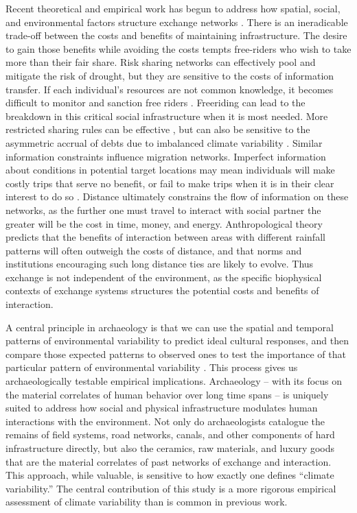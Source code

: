 \documentclass[fleqn,10pt]{wlscirep}
\begin{document}
Recent theoretical and empirical work has begun to address how spatial, social, and environmental factors structure exchange networks \cite{Nolin2010Food-SharingIndonesia,Koster2014,Hao2015,Schnegg2015}. 
There is an ineradicable trade-off between the costs and benefits of maintaining infrastructure. The desire to gain those benefits while avoiding the costs tempts free-riders who wish to take more than their fair share.
Risk sharing networks can effectively pool and mitigate the risk of drought, but they are sensitive to the costs of information transfer. If each individual's resources are not common knowledge, it becomes difficult to monitor and sanction free riders \cite{Hao2015a}. Freeriding can lead to the breakdown in this critical social infrastructure when it is most needed. More restricted sharing rules can be effective \cite{Hegmon1996}, but can also be sensitive to the asymmetric accrual of debts due to imbalanced climate variability \cite{Crabtree2015}. Similar information constraints influence migration networks. Imperfect information about conditions in potential target locations may mean individuals will make costly trips that serve no benefit, or fail to make trips when it is in their clear interest to do so \cite{Anderies2011a}. Distance ultimately constrains the flow of information on these networks, as the further one must travel to interact with social partner the greater will be the cost in time, money, and energy. Anthropological theory predicts that the benefits of interaction between areas with different rainfall patterns will often outweigh the costs of distance, and that norms and institutions encouraging such long distance ties are likely to evolve. Thus exchange is not independent of the environment, as the specific biophysical contexts of exchange systems structures the potential costs and benefits of interaction.

A central principle in archaeology is that we can use the spatial and temporal patterns of environmental variability to predict ideal cultural responses, and then compare those expected patterns to observed ones to test the importance of that particular pattern of environmental variability \cite{halstead1989}. This process gives us archaeologically testable empirical implications. Archaeology -- with its focus on the material correlates of human behavior over long time spans -- is uniquely suited to address how social and physical infrastructure modulates human interactions with the environment. Not only do archaeologists catalogue the remains of field systems, road networks, canals, and other components of hard infrastructure directly, but also the ceramics, raw materials, and luxury goods that are the material correlates of past networks of exchange and interaction. This approach, while valuable, is sensitive to how exactly one defines ``climate variability.'' The central contribution of this study is a more rigorous empirical assessment of climate variability than is common in previous work.
\end{document}
